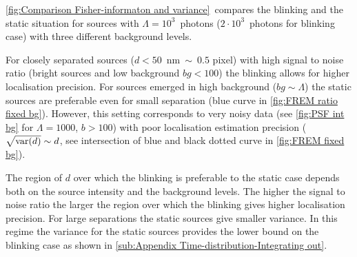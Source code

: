 

\autoref{fig:Comparison Fisher-informaton and variance}\bbb\ compares the blinking and the static situation for sources with $\Lambda=10^3$~photons ($2\cdot10^3$~photons for blinking case) with three different background levels.

For closely separated sources ($d<50$~nm$\ \sim\ 0.5$ pixel) with high signal to noise ratio (bright sources and low background $bg<100$) the blinking allows for higher localisation precision. For sources emerged in high background ($bg\sim\Lambda$) the static sources are preferable even for small separation (blue curve in \autoref{fig:FREM ratio fixed bg}). However, this setting corresponds to very noisy data (see \autoref{fig:PSF int bg} for $\Lambda=1000$, $b>100$) with poor localisation estimation precision ($\sqrt{\mathrm{var}(d)}\sim d$, see intersection of blue and black dotted curve in \autoref{fig:FREM fixed bg}). 

The region of $d$ over which the blinking is preferable to the static case depends both on the source intensity and the background levels. The higher the signal to noise ratio the larger the region over which the blinking gives higher localisation precision. For large separations the static sources give smaller variance. In this regime the variance for the static sources provides the lower bound on the blinking case as shown in \autoref{sub:Appendix Time-distribution-Integrating out}.

\clearpage
